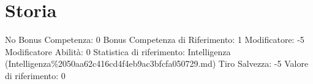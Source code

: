 \section{Storia}\label{storia}

\begin{description}
\tightlist
\item[Tags: ABI]
No Bonus Competenza: 0 Bonus Competenza di Riferimento: 1 Modificatore:
-5 Modificatore Abilità: 0 Statistica di riferimento: Intelligenza
(Intelligenza\%2050aa62c416cd4f4eb9ac3bfcfa050729.md) Tiro Salvezza: -5
Valore di riferimento: 0
\end{description}
